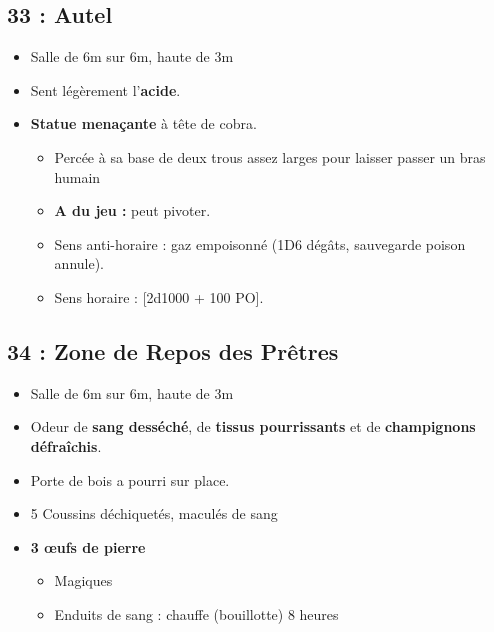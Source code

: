 \subsection{33 : Autel}\label{n3:s33}
\begin{itemize}
  \item Salle de 6m sur 6m, haute de 3m
  \item Sent légèrement l’\textbf{acide}.
  \item \textbf{Statue menaçante} à tête de cobra. 
  \begin{itemize}
    \item Percée à sa base de deux trous assez larges pour laisser passer un bras humain
    \item \textbf{A du jeu :} peut pivoter.
    \item Sens anti-horaire : gaz empoisonné (1D6 dégâts, sauvegarde poison annule).
    \item Sens horaire : [2d1000 + 100 PO].
  \end{itemize}
\end{itemize}

\subsection{34 : Zone de Repos des Prêtres}\label{n3:s34}
\begin{itemize}
  \item Salle de 6m sur 6m, haute de 3m
  \item Odeur de \textbf{sang desséché}, de \textbf{tissus pourrissants} et de \textbf{champignons défraîchis}.
  \item Porte de bois a pourri sur place.
  \item 5 Coussins déchiquetés, maculés de sang
  \item \textbf{3 \oe ufs de pierre }
  \begin{itemize}
    \item Magiques
    \item Enduits de sang : chauffe (bouillotte) 8 heures
  \end{itemize}
\end{itemize}
  
